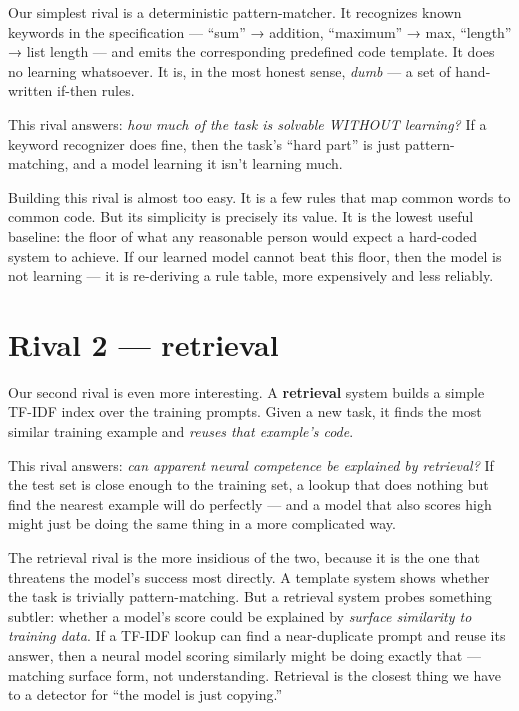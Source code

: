 Our simplest rival is a deterministic pattern-matcher. It recognizes
known keywords in the specification --- ``sum'' → addition, ``maximum''
→ max, ``length'' → list length --- and emits the corresponding
predefined code template. It does no learning whatsoever. It is, in the
most honest sense, \emph{dumb} --- a set of hand-written if-then rules.

This rival answers: \emph{how much of the task is solvable WITHOUT
learning?} If a keyword recognizer does fine, then the task's ``hard
part'' is just pattern-matching, and a model learning it isn't learning
much.

Building this rival is almost too easy. It is a few rules that map
common words to common code. But its simplicity is precisely its value.
It is the lowest useful baseline: the floor of what any reasonable
person would expect a hard-coded system to achieve. If our learned model
cannot beat this floor, then the model is not learning --- it is
re-deriving a rule table, more expensively and less reliably.

\section{Rival 2 --- retrieval}\label{rival-2-retrieval}

Our second rival is even more interesting. A \textbf{retrieval} system
builds a simple TF-IDF index over the training prompts. Given a new
task, it finds the most similar training example and \emph{reuses that
example's code}.

This rival answers: \emph{can apparent neural competence be explained by
retrieval?} If the test set is close enough to the training set, a
lookup that does nothing but find the nearest example will do perfectly
--- and a model that also scores high might just be doing the same thing
in a more complicated way.

The retrieval rival is the more insidious of the two, because it is the
one that threatens the model's success most directly. A template system
shows whether the task is trivially pattern-matching. But a retrieval
system probes something subtler: whether a model's score could be
explained by \emph{surface similarity to training data}. If a TF-IDF
lookup can find a near-duplicate prompt and reuse its answer, then a
neural model scoring similarly might be doing exactly that --- matching
surface form, not understanding. Retrieval is the closest thing we have
to a detector for ``the model is just copying.''

